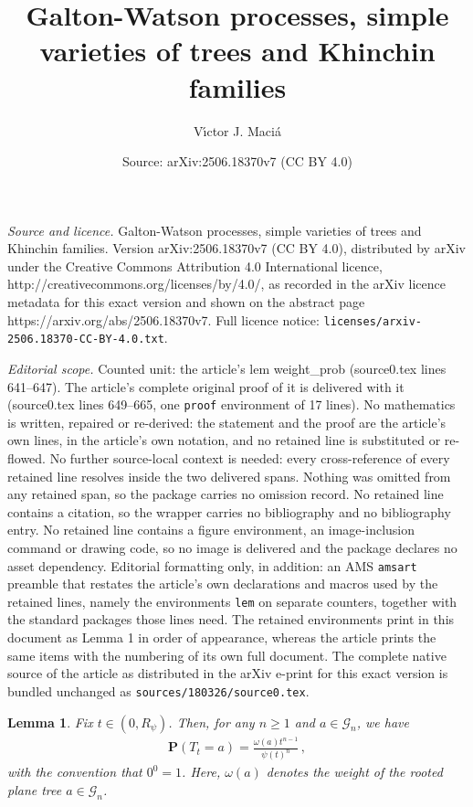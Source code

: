 \documentclass[10pt,a4paper]{amsart}
\title{Galton-Watson processes, simple varieties of trees and Khinchin families}
\author{V\'{\i}ctor J. Maci\'a}
\date{Source: arXiv:2506.18370v7 (CC BY 4.0)}
\newtheorem{lem}{Lemma}
\def\P{\mathbf{P}}
\begin{document}
\maketitle

\noindent\emph{Source and licence.} Galton-Watson processes, simple varieties of trees and Khinchin families. Version arXiv:2506.18370v7 (CC BY 4.0), distributed by arXiv under the Creative Commons Attribution 4.0 International licence, http://creativecommons.org/licenses/by/4.0/, as recorded in the arXiv licence metadata for this exact version and shown on the abstract page https://arxiv.org/abs/2506.18370v7. Full licence notice: \texttt{licenses/arxiv-2506.18370-CC-BY-4.0.txt}.\par\smallskip

\noindent\textit{Editorial scope.} Counted unit: the article's lem weight\_prob (source0.tex lines 641--647). The article's complete original proof of it is delivered with it (source0.tex lines 649--665, one \texttt{proof} environment of 17 lines). No mathematics is written, repaired or re-derived: the statement and the proof are the article's own lines, in the article's own notation, and no retained line is substituted or re-flowed.  No further source-local context is needed: every cross-reference of every retained line resolves inside the two delivered spans.  Nothing was omitted from any retained span, so the package carries no omission record.  No retained line contains a citation, so the wrapper carries no bibliography and no bibliography entry.  No retained line contains a figure environment, an image-inclusion command or drawing code, so no image is delivered and the package declares no asset dependency.  Editorial formatting only, in addition: an AMS \texttt{amsart} preamble that restates the article's own declarations and macros used by the retained lines, namely the environments \texttt{lem} on separate counters, together with the standard packages those lines need.  The retained environments print in this document as Lemma 1 in order of appearance, whereas the article prints the same items with the numbering of its own full document.  The complete native source of the article as distributed in the arXiv e-print for this exact version is bundled unchanged as \texttt{sources/180326/source0.tex}.
	\begin{lem} \label{lemma: weight_prob}
		Fix \( t \in (0,R_{\psi}) \). Then, for any \( n \geq 1 \) and \( a \in \mathcal{G}_n \), we have
		\begin{align*}
			\P(T_t = a) = \frac{\omega(a)t^{n-1}}{\psi(t)^n}\,,  
		\end{align*}
		with the convention that $0^0 = 1$. Here, \( \omega(a) \) denotes the weight of the rooted plane tree \( a \in \mathcal{G}_n \).
	\end{lem}
\end{document}
